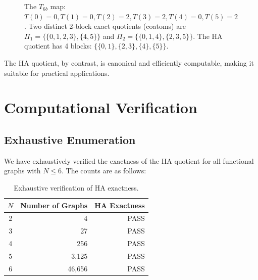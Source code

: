 \documentclass[11pt, a4paper]{article}
\theoremstyle{definition}
\theoremstyle{remark}
\begin{document}
\begin{figure}[ht]
\centering
{}
\caption{The \(T_{6b}\) map: \(T(0)=0, T(1)=0, T(2)=2, T(3)=2, T(4)=0, T(5)=2\). Two distinct 2-block exact quotients (coatoms) are \(\Pi_1 = \{\{0,1,2,3\},\{4,5\}\}\) and \(\Pi_2 = \{\{0,1,4\},\{2,3,5\}\}\). The HA quotient has 4 blocks: \(\{\{0,1\},\{2,3\},\{4\},\{5\}\}\).}
\label{fig:two_coatoms}
\end{figure}

The HA quotient, by contrast, is canonical and efficiently computable, making it suitable for practical applications.

\section{Computational Verification}

\subsection{Exhaustive Enumeration}

We have exhaustively verified the exactness of the HA quotient for all functional graphs with \(N \le 6\). The counts are as follows:

\begin{table}[h]
\centering
\begin{tabular}{c|r|r}
\toprule
\(N\) & Number of Graphs & HA Exactness \\
\midrule
2 & 4 & PASS \\
3 & 27 & PASS \\
4 & 256 & PASS \\
5 & 3,125 & PASS \\
6 & 46,656 & PASS \\
\bottomrule
\end{tabular}
\caption{Exhaustive verification of HA exactness.}
\end{table}
\end{document}
